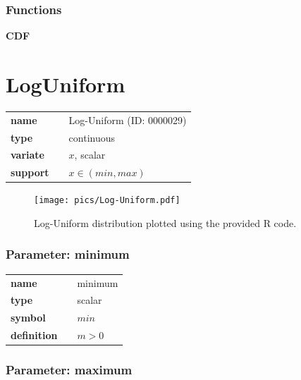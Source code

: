 \documentclass{article}
\begin{document}
\subsubsection*{Functions}

\smallskip \noindent \hspace{.2cm} \textbf{} 
\begin{equation*}\end{equation*}
\smallskip \noindent \hspace{.2cm} \textbf{CDF} 
\begin{equation*}\end{equation*}
\smallskip\section*{LogUniform} 

  \bigskip 

\begin{tabular}{p{2cm}cl}
\textbf{name} & & Log-Uniform (ID: 0000029)\\ 
 
\textbf{type} & & continuous \\ 

\textbf{variate} & & $x$, scalar \\ 

\textbf{support} & & $x \in (min,max)$
\end{tabular}

\begin{figure}[ht!]
\centering
  \texttt{[image: pics/Log-Uniform.pdf]}
 \caption{Log-Uniform distribution plotted using the provided R code.}
 \label{fig:Log-Uniform}
\end{figure}

\subsubsection*{Parameter: minimum}

\noindent\begin{tabular}{p{2cm}cl}
\textbf{name} & & minimum \\
\textbf{type} & & scalar \\
\textbf{symbol} & & $min$  \\
\textbf{definition} & & $m>0$
\end{tabular}
\subsubsection*{Parameter: maximum}
\end{document}
